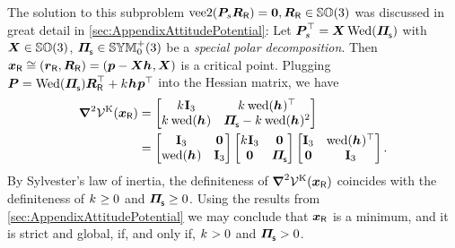 The solution to this subproblem $\operatorname{vee2}(\boldsymbol{P}_{\!s} \boldsymbol{R}_{\mathsf{R}}) = \boldsymbol{0}, \boldsymbol{R}_{\mathsf{R}}\in\mathbb{SO}(3)$ was discussed in great detail in \autoref{sec:AppendixAttitudePotential}:
Let $\mat{P}_{\!s}^\top = \mat{X} \wedMatOp(\bodyMOSs{}{})$ with $\boldsymbol{X}\in\mathbb{SO}(3)$, $\bodyMOSs{}{}\in\SymMatSP(3)$ be a \textit{special polar decomposition}.
Then $\sysCoordR \cong (\rR, \RR) = (\tuple{p} - \mat{X} \bodyCOS{}{}, \mat{X})$ is a critical point.
Plugging $\mat{P} = \wedMatOp(\bodyMOSs{}{}) \RR^\top + \bodyStiffness{}{}\bodyCOS{}{}\tuple{p}^\top$ into the Hessian matrix, we have
\begin{align}
 \differential^2 \potentialStiff(\sysCoordR) 
 &= \begin{bmatrix} \bodyStiffness{}{} \idMat[3] & \bodyStiffness{}{}\wedOp(\bodyCOS{}{})^\top \\ \bodyStiffness{}{}\wedOp(\bodyCOS{}{}) & \bodyMOSs{}{} - \bodyStiffness{}{} \wedOp(\bodyCOS{}{})^2 \end{bmatrix}
\nonumber\\
 &= \begin{bmatrix} \idMat[3] & \mat{0} \\ \wedOp(\bodyCOS{}{}) & \idMat[3] \end{bmatrix}
 \begin{bmatrix} 
  \bodyStiffness{}{} \idMat[3] & \mat{0} \\
  \mat{0} & \bodyMOSs{}{}
 \end{bmatrix}
 \begin{bmatrix} \idMat[3] & \wedOp(\bodyCOS{}{})^\top \\ \mat{0} & \idMat[3] \end{bmatrix}
 .
\end{align}
By Sylvester's law of inertia, the definiteness of $\boldsymbol{\nabla}^2 \mathcal{V}^{\mathrm{K}}(\boldsymbol{x}_{\mathsf{R}})$ coincides with the definiteness of $\bodyStiffness{}{} \geq 0$ and $\bodyMOSs{}{} \geq 0$.
Using the results from \autoref{sec:AppendixAttitudePotential} we may conclude that $\boldsymbol{x}_{\mathsf{R}}$ is a minimum, and it is strict and global, if, and only if, $\bodyStiffness{}{} > 0$ and $\bodyMOSs{}{} > 0$.

